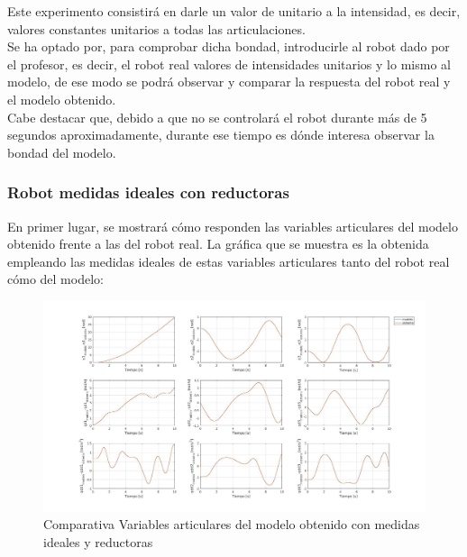 Este experimento consistirá en darle un valor de unitario a la intensidad, es decir, valores constantes unitarios a todas las articulaciones. \\

Se ha optado por, para comprobar dicha bondad, introducirle al robot dado por el profesor, es decir, el robot real valores de intensidades unitarios y lo mismo al modelo, de ese modo se podrá observar y comparar la respuesta del robot real y el modelo obtenido.\\



Cabe destacar que, debido a que no se controlará el robot durante más de 5 segundos aproximadamente, durante ese tiempo es dónde interesa observar la bondad del modelo.

\subsubsection{Robot medidas ideales con reductoras}

En primer lugar, se mostrará cómo responden las variables articulares del modelo obtenido frente a las del robot real. La gráfica que se muestra es la obtenida empleando las medidas ideales de estas variables articulares tanto del robot real cómo del modelo:



\begin{figure}[h!]
	
	\centering
	
	\includegraphics[width=1\textwidth]{EstimacParam_SisMod_In1_IdealCR}
	
	\caption{Comparativa Variables articulares del modelo obtenido con medidas ideales y reductoras}
	
\end{figure}



